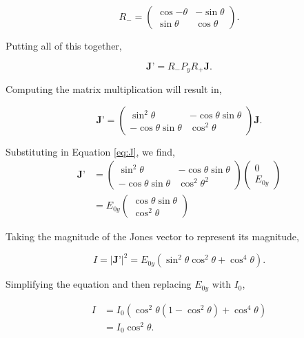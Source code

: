 \documentclass{article}
\begin{document}
\begin{equation}
    \textbf{$R_-$} = \begin{pmatrix}
        \cos{-\theta} & -\sin{\theta} \\
        \sin{\theta} & \cos{\theta}
    \end{pmatrix}.
\end{equation}

Putting all of this together,

\begin{equation}
    \textbf{J'} = R_- P_y R_+ \textbf{J}.
\end{equation}

Computing the matrix multiplication will result in,

\begin{equation}
    \textbf{J'} = \begin{pmatrix}
        \sin^2{\theta} & -\cos{\theta}\sin{\theta} \\
        -\cos{\theta}\sin{\theta} & \cos^2{\theta}
    \end{pmatrix} \textbf{J}.
\end{equation}

Substituting in Equation \ref{eq:J}, we find,
\begin{align}
    \textbf{J'} &= \begin{pmatrix}
        \sin^2{\theta} & -\cos{\theta}\sin{\theta} \\
        -\cos{\theta}\sin{\theta} & \cos^2{\theta}^2
    \end{pmatrix} 
    \begin{pmatrix}
        0 \\
        E_{0y}
    \end{pmatrix} \\
    &= E_{0y}\begin{pmatrix}
        \cos{\theta}\sin{\theta} \\
        \cos^2{\theta}
    \end{pmatrix}
\end{align}

Taking the magnitude of the Jones vector to represent its magnitude,

\begin{equation}
    I = |\textbf{J'}|^2 = E_{0y}(\sin^2{\theta}\cos^2{\theta}+\cos^4{\theta}).
\end{equation}

Simplifying the equation and then replacing $E_{0y}$ with $I_0$,

\begin{align}
    I &= I_0(\cos^2{\theta}(1-\cos^2{\theta})+\cos^4{\theta}) \\
    &= I_0\cos^2{\theta}.
\end{align}
\end{document}
